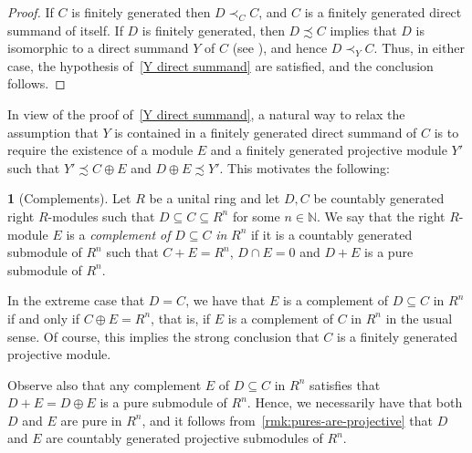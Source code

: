 \documentclass[11pt]{amsart}
\numberwithin{equation}{section}
\theoremstyle{definition}
\newtheorem{pgr}[pgrCt]{}
\newtheorem{dfn}[dfnCt]{Definition}
\theoremstyle{plain}
\theoremstyle{definition}
\begin{document}
\begin{proof}
If $C$ is finitely generated then $D \prec_C C$, and $C$ is a finitely generated direct summand of itself. If $D$ is finitely generated, then $D \precsim C$ implies that $D$ is isomorphic to a direct summand $Y$ of $C$ (see \cite[Remark 4.6]{AntAraBosPerVil25}), and hence $D \prec_Y C$. Thus, in either case, the hypothesis of~\autoref{Y direct summand} are satisfied, and the conclusion follows.
\end{proof}

In view of the proof of~\autoref{Y direct summand}, a natural way to relax the assumption that $Y$ is contained in a finitely generated direct summand of $C$ is to require the existence of a module $E$ and a finitely generated projective module $Y'$ such that $Y' \precsim C \oplus E$ and $D \oplus E \precsim Y'$. This motivates the following:

\begin{pgr}[Complements]
\label{dfn:complement}
Let $R$ be a unital ring and let $D, C$ be countably generated right $R$-modules such that $D \subseteq C \subseteq R^n$ for some $n \in \mathbb{N}$. We say that the right $R$-module $E$ is a \emph{complement of} $D \subseteq C$ \emph{in} $R^n$ if it is a countably generated submodule of $R^n$ such that $C + E = R^n$, $D \cap E = 0$ and $D + E$ is a pure submodule of $R^n$. 

In the extreme case that $D = C$, we have that $E$ is a complement of $D \subseteq C$ in $R^n$ if and only if $C \oplus E = R^n$, that is, if $E$ is a complement of $C$ in $R^n$ in the usual sense. Of course, this implies the strong conclusion that $C$ is a finitely generated projective module.

Observe also that any complement $E$ of $D\subseteq C$ in $R^n$ satisfies that $D+E =D\oplus E$ is a pure submodule of $R^n$. Hence, we necessarily have that both $D$ and $E$ are pure in $R^n$, and it follows from~\autoref{rmk:pures-are-projective} that $D$ and $E$ are countably generated projective submodules of $R^n$.

\end{pgr}
\end{document}
